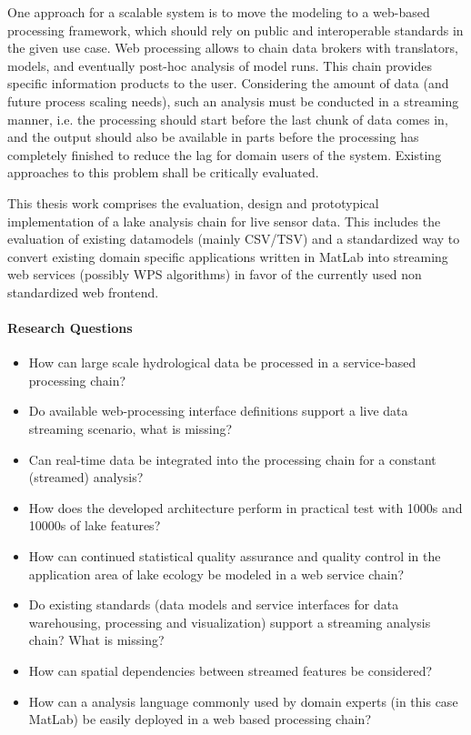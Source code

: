 	One approach for a scalable system is to move the modeling to a web-based processing framework, which should rely on public and interoperable standards in the given use case.
	Web processing allows to chain data brokers with translators, models, and eventually post-hoc analysis of model runs.
	This chain provides specific information products to the user.
	Considering the amount of data (and future process scaling needs), such an analysis must be conducted in a streaming manner, i.e. the processing should start before the last chunk of data comes in, and the output should also be available in parts before the processing has completely finished to reduce the lag for domain users of the system.
	Existing approaches to this problem shall be critically evaluated.

	This thesis work comprises the evaluation, design and prototypical implementation of a lake analysis chain for live sensor data.
	This includes the evaluation of existing datamodels (mainly CSV/TSV) and a standardized way to convert existing domain specific applications written in MatLab into streaming web services (possibly WPS algorithms) in favor of the currently used non standardized web frontend.

	\paragraph*{Research Questions}
	\begin{itemize}
		\item How can large scale hydrological data be processed in a service-based processing chain?
		\item Do available web-processing interface definitions support a live data streaming scenario, what is missing?
		\item Can real-time data be integrated into the processing chain for a constant (streamed) analysis?
		\item How does the developed architecture perform in practical test with 1000s and 10000s of lake features?
		\item How can continued statistical quality assurance and quality control in the application area of lake ecology be modeled in a web service chain?
		\item Do existing standards (data models and service interfaces for data warehousing, processing and visualization) support a streaming analysis chain? What is missing?
		\item How can spatial dependencies between streamed features be considered?
		\item How can a analysis language commonly used by domain experts (in this case MatLab) be easily deployed in a web based processing chain?
	\end{itemize}


